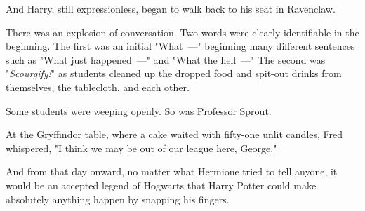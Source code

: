 And Harry, still expressionless, began to walk back to his seat in Ravenclaw.

There was an explosion of conversation. Two words were clearly identifiable in
the beginning. The first was an initial "What~---" beginning many different
sentences such as "What just happened~---" and "What the hell~---" The second was
"\emph{Scourgify!}" as students cleaned up the dropped food and spit-out drinks
from themselves, the tablecloth, and each other.

Some students were weeping openly. So was Professor Sprout.

At the Gryffindor table, where a cake waited with fifty-one unlit candles, Fred
whispered, "I think we may be out of our league here, George."

And from that day onward, no matter what Hermione tried to tell anyone, it
would be an accepted legend of Hogwarts that Harry Potter could make absolutely
anything happen by snapping his fingers.
